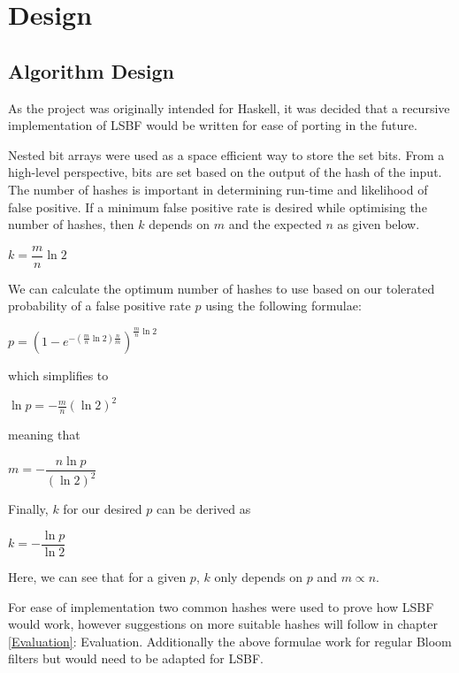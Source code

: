 \chapter{Design}

\section{Algorithm Design}
As the project was originally intended for Haskell, it was decided that a recursive implementation of LSBF would be written for ease of porting in the future.

Nested bit arrays were used as a space efficient way to store the set bits. From a high-level perspective, bits are set based on the output of the hash of the input. The number of hashes is important in determining run-time and likelihood of false positive. If a minimum false positive rate is desired while optimising the number of hashes, then $k$ depends on $m$ and the expected $n$ as given below.\cite{ProbabilityAndComputing}
\begin{center}
	$ k = \dfrac{m}{n}\ln 2 $
\end{center}
We can calculate the optimum number of hashes to use based on our tolerated probability of a false positive rate $p$ using the following formulae:\cite{1195150}

\begin{center}
	$p=\left( 1-e^{-(\frac{m}{n}\ln 2)\frac{n}{m}} \right)^{\frac{m}{n}\ln 2} $
\end{center}

which simplifies to

\begin{center}
$\ln p = -\frac{m}{n}(\ln 2)^2$
\end{center}

meaning that

\begin{center}
$m = -\dfrac{n\ln p}{(\ln 2)^2}$
\end{center}

Finally, $k$ for our desired $p$ can be derived as

\begin{center}
	$k = -\dfrac{\ln p}{\ln 2}$
\end{center}

Here, we can see that for a given $p$, $k$ only depends on $p$ and $m \propto n$.

For ease of implementation two common hashes were used to prove how LSBF would work, however suggestions on more suitable hashes will follow in chapter \ref{Evaluation}: Evaluation. Additionally the above formulae work for regular Bloom filters but would need to be adapted for LSBF.

